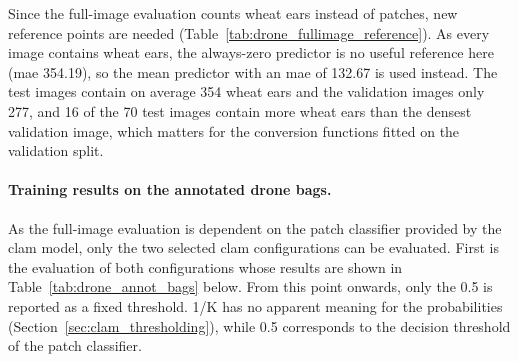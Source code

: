\documentclass[12pt,parskip = half, DIV=classic,listof=totoc]{scrartcl}
\begin{document}
		Since the full-image evaluation counts wheat ears instead of patches, new reference points are needed 
		(Table~\ref{tab:drone_fullimage_reference}). As every image contains wheat ears, the always-zero predictor 
		is no useful reference here (\ac{mae} 354.19), so the mean predictor with an \ac{mae} of 132.67 is used instead. 
		The test images contain on average 354 wheat ears and the validation images only 277, and 16 of the 
		70 test images contain more wheat ears than the densest validation image, which matters for the 
		conversion functions fitted on the validation split.


		\paragraph{Training results on the annotated drone bags.}
		As the full-image evaluation is dependent on the patch classifier provided by the \ac{clam} model, only the two selected \ac{clam} configurations 
		can be evaluated. First is the evaluation of both configurations whose results are shown in Table~\ref{tab:drone_annot_bags} below. 
		From this point onwards, only the 0.5 is reported as a fixed threshold. 1/K has no apparent meaning for the
		probabilities (Section~\ref{sec:clam_thresholding}), while 0.5 corresponds to the decision threshold of the
		patch classifier.
\end{document}
